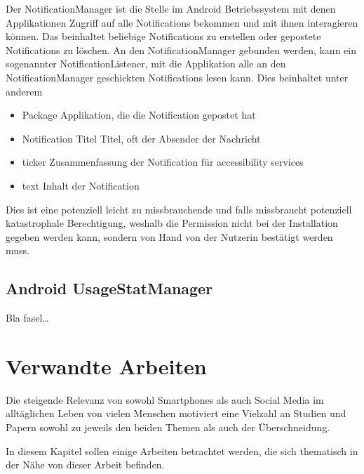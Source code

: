 Der NotificationManager ist die Stelle im Android Betriebssystem mit denen Applikationen Zugriff auf alle Notifications bekommen und mit ihnen interagieren können.
Das beinhaltet beliebige Notifications zu erstellen oder gepostete Notifications zu löschen.
An den NotificationManager gebunden werden, kann ein sogenannter NotificationListener, mit die Applikation alle an den NotificationManager geschickten Notifications lesen kann.
Dies beinhaltet unter anderem
\begin{itemize}
    \item {Package} Applikation, die die Notification gepostet hat
    \item {Notification Titel} Titel, oft der Absender der Nachricht
    \item {ticker} Zusammenfassung der Notification für accessibility services
    \item {text} Inhalt der Notification
\end{itemize}
Dies ist eine potenziell leicht zu missbrauchende und falls missbraucht potenziell katastrophale Berechtigung, weshalb die Permission nicht bei der Installation gegeben werden kann, sondern von Hand von der Nutzerin bestätigt werden muss. 

\subsection {Android UsageStatManager}




\label{ch:Grundlagen:sec:Abschnitt2}

Bla fasel\ldots

\section{Verwandte Arbeiten}
\label{ch:Grundlagen:sec:RelatedWork}

Die steigende Relevanz von sowohl Smartphones als auch Social Media im alltäglichen Leben von vielen Menschen
motiviert eine Vielzahl an Studien und Papern sowohl zu jeweils den beiden Themen als auch der Überschneidung. 

In diesem Kapitel sollen einige Arbeiten betrachtet werden, die sich thematisch in der Nähe von dieser Arbeit befinden.



